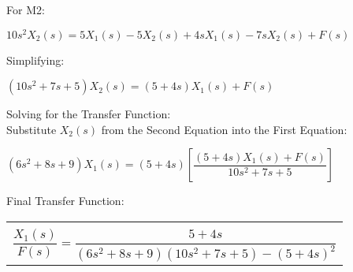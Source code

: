 \documentclass[11pt,letterpaper]{article}
\begin{document}
For M2:\\
\begin{center}
	$10s^2X_2(s)=5X_1(s)-5X_2(s)+4sX_1(s)-7sX_2(s)+F(s)$\\
\end{center}
Simplifying:\\
\begin{center}
	$(10s^2+7s+5)X_2(s)=(5+4s)X_1(s)+F(s)$\\
\end{center}
Solving for the Transfer Function:\\[12pt]
Substitute $X_2(s)$ from the Second Equation into the First Equation:\\
\begin{center}
	$(6s^2+8s+9)X_1(s)=(5+4s)\left[\dfrac{(5+4s)X_1(s)+F(s)}{10s^2+7s+5}\right] $\\
\end{center}
Final Transfer Function:\\
\begin{center}
	\begin{tabular}{|c|}
		\hline \\
		$\dfrac{X_1(s)}{F(s)}=\dfrac{5+4s}{(6s^2+8s+9)(10s^2+7s+5)-(5+4s)^2}$	\\ [12pt]
	\hline
	\end{tabular}	
\end{center}

\clearpage
\end{document}
